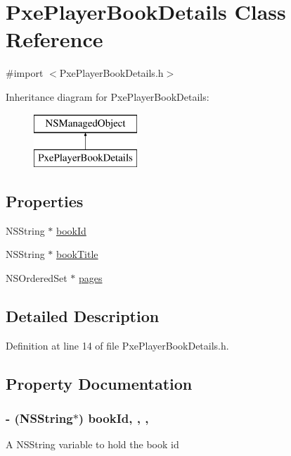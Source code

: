 \hypertarget{interface_pxe_player_book_details}{\section{Pxe\-Player\-Book\-Details Class Reference}
\label{interface_pxe_player_book_details}
}


{\ttfamily \#import $<$Pxe\-Player\-Book\-Details.\-h$>$}

Inheritance diagram for Pxe\-Player\-Book\-Details\-:\begin{figure}[H]
\begin{center}
\leavevmode
\includegraphics[height=2.000000cm]{interface_pxe_player_book_details}
\end{center}
\end{figure}
\subsection*{Properties}
\begin{DoxyCompactItemize}
\item 
N\-S\-String $\ast$ \hyperlink{interface_pxe_player_book_details_a0d116169121d2c2ff845beebdc18e8f7}{book\-Id}
\item 
N\-S\-String $\ast$ \hyperlink{interface_pxe_player_book_details_a34d0ade8fbd6a3bbe7cba760dec26d8c}{book\-Title}
\item 
N\-S\-Ordered\-Set $\ast$ \hyperlink{interface_pxe_player_book_details_a6da96231ab61dc6eed9e7856ebded73c}{pages}
\end{DoxyCompactItemize}


\subsection{Detailed Description}


Definition at line 14 of file Pxe\-Player\-Book\-Details.\-h.



\subsection{Property Documentation}
\hypertarget{interface_pxe_player_book_details_a0d116169121d2c2ff845beebdc18e8f7}{
\subsubsection[{book\-Id}]{\setlength{\rightskip}{0pt plus 5cm}-\/ (N\-S\-String$\ast$) book\-Id\hspace{0.3cm}{\ttfamily [read]}, {\ttfamily [write]}, {\ttfamily [nonatomic]}, {\ttfamily [retain]}}}\label{interface_pxe_player_book_details_a0d116169121d2c2ff845beebdc18e8f7}
A N\-S\-String variable to hold the book id 

